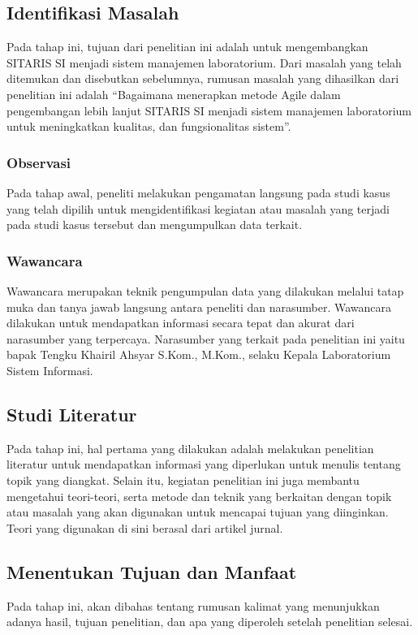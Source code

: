 \subsection{Identifikasi Masalah}
Pada tahap ini, tujuan dari penelitian ini adalah untuk mengembangkan SITARIS SI menjadi sistem manajemen laboratorium. Dari masalah yang telah ditemukan dan disebutkan sebelumnya, rumusan masalah yang dihasilkan dari penelitian ini adalah “Bagaimana menerapkan metode Agile dalam pengembangan lebih lanjut SITARIS SI menjadi sistem manajemen laboratorium untuk meningkatkan kualitas, dan fungsionalitas sistem”.

\subsubsection{Observasi}
Pada tahap awal, peneliti melakukan pengamatan langsung pada studi kasus yang telah dipilih untuk mengidentifikasi kegiatan atau masalah yang terjadi pada studi kasus tersebut dan mengumpulkan data terkait.

\subsubsection{Wawancara}
Wawancara merupakan teknik pengumpulan data yang dilakukan melalui tatap muka dan tanya jawab langsung antara peneliti dan narasumber. Wawancara dilakukan untuk mendapatkan informasi secara tepat dan akurat dari narasumber yang terpercaya. Narasumber yang terkait pada penelitian ini yaitu bapak Tengku Khairil Ahsyar S.Kom., M.Kom., selaku Kepala Laboratorium Sistem Informasi.

\subsection{Studi Literatur}
Pada tahap ini, hal pertama yang dilakukan adalah melakukan penelitian literatur untuk mendapatkan informasi yang diperlukan untuk menulis tentang topik yang diangkat. Selain itu, kegiatan penelitian ini juga membantu mengetahui teori-teori, serta metode dan teknik yang berkaitan dengan topik atau masalah yang akan digunakan untuk mencapai tujuan yang diinginkan. Teori yang digunakan di sini berasal dari artikel jurnal.

\subsection{Menentukan Tujuan dan Manfaat}
Pada tahap ini, akan dibahas tentang rumusan kalimat yang menunjukkan adanya hasil, tujuan penelitian, dan apa yang diperoleh setelah penelitian selesai.

